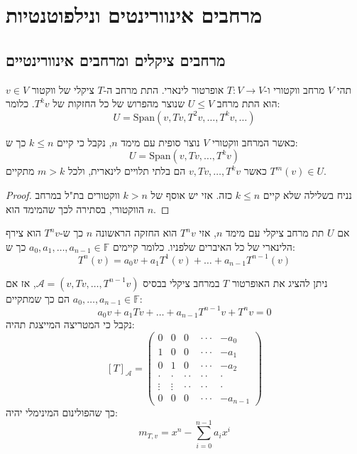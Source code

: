 \documentclass{tstextbook}
\begin{document}
\section{מרחבים אינוורינטים ונילפוטנטיות}

\subsection{מרחבים ציקלים ומרחבים אינוורינטיים}

\begin{definition}
תהי \(V\) מרחב ווקטורי ו-\(T:V\to V\) אופרטור לינארי. התת מרחב ה-\(T\) ציקלי של ווקטור \(v \in V\) הוא התת מרחב \(U\leq V\) שנוצר מהפרוש של כל החזקות של \(T^{k}v\). כלומר:
$$U=\mathrm{Span}\left( v,Tv,T^{2}v, \dots, T^{k}v, \dots \right)$$

\end{definition}
\begin{proposition}
כאשר המרחב ווקטורי \(V\) נוצר סופית עם מימד \(n\), נקבל כי קיים \(k\leq n\) כך ש:
$$U=\mathrm{Span}\left( v,Tv, \dots, T^{k}v \right)$$
כאשר \(v,Tv, \dots, T^{k}v\) הם בלתי תלויים לינארית, ולכל \(m>k\) מתקיים \(T^{m}(v)\in U\).

\end{proposition}
\begin{proof}
נניח בשלילה שלא קיים \(k\leq n\) כזה. אזי יש אוסף של \(k>n\) ווקטורים בת"ל במרחב הווקטורי, בסתירה לכך שהמימד הוא \(n\).

\end{proof}
\begin{corollary}
אם \(U\) תת מרחב ציקלי עם מימד \(n\), אזי \(T^{n}v\) הוא החזקה הראשונה \(n\) כך ש-\(T^{n}v\) הוא צירף הלינארי של כל האיברים שלפניו. כלומר קיימים \(a_{0},a_{1},\dots,a_{n-1}\in \mathbb{F}\) כך ש:
$$T^{n}(v)=a_{0}v+a_{1}T^{1}(v)+ \dots + a_{n-1}T^{n-1}(v)$$

\end{corollary}
\begin{proposition}
ניתן להציג את האופרטור \(T\) במרחב ציקלי בבסיס \(\mathcal{A}=\left( v,Tv, \dots,T^{n-1}v \right)\), אז אם \(a_{0},\dots ,a_{n-1} \in \mathbb{F}\) הם כך שמתקיים:
$$a_{0}v+a_{1}Tv+ \dots + a_{n-1}T^{n-1}v + T^{n}v = 0$$
נקבל כי המטריצה המייצגת תהיה:
$$[T]_{\mathcal{A} }=\begin{pmatrix}0&0&0&\cdot\cdot\cdot&-a_{0}\\ 1&0&0&\cdot\cdot\cdot&-a_{1}\\ 0&1&0&\cdot\cdot\cdot&-a_{2}\\ \cdot&\cdot&\cdot\cdot&\cdot\cdot&\cdot\\ \vdots&\vdots&\cdot\cdot&\cdot\cdot&\cdot\\ 0&0&0&\cdot\cdot\cdot&-a_{n-1}\end{pmatrix}$$
כך שהפולינום המינימלי יהיה:
$$m_{T,v}=x^{n}-\sum_{i=0}^{n-1} a_{i}x^{i}$$

\end{proposition}
\end{document}
